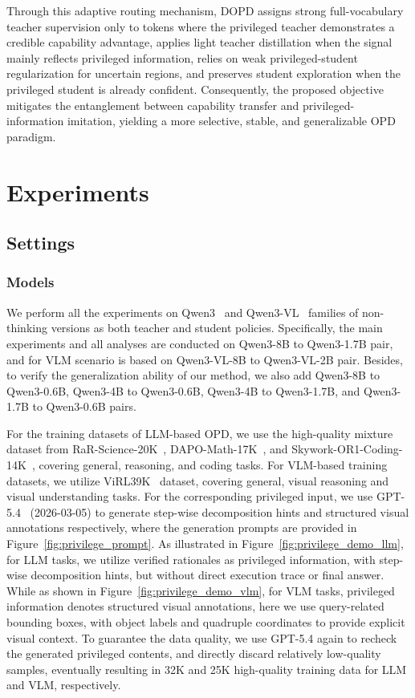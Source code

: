 \documentclass{llmxive}
\begin{document}
Through this adaptive routing mechanism, DOPD assigns strong full-vocabulary teacher supervision only to tokens where the privileged teacher demonstrates a credible capability advantage, applies light teacher distillation when the signal mainly reflects privileged information, relies on weak privileged-student regularization for uncertain regions, and preserves student exploration when the privileged student is already confident. 
Consequently, the proposed objective mitigates the entanglement between capability transfer and privileged-information imitation, yielding a more selective, stable, and generalizable OPD paradigm.




\section{Experiments}
\subsection{Settings}
\subsubsection{Models}
We perform all the experiments on Qwen3~\citep{yang2025qwen3} and Qwen3-VL~\citep{bai2025qwen3} families of non-thinking versions as both teacher and student policies. Specifically, the main experiments and all analyses are conducted on Qwen3-8B to Qwen3-1.7B pair, and for VLM scenario is based on Qwen3-VL-8B to Qwen3-VL-2B pair. Besides, to verify the generalization ability of our method, we also add Qwen3-8B to Qwen3-0.6B, Qwen3-4B to Qwen3-0.6B, Qwen3-4B to Qwen3-1.7B, and Qwen3-1.7B to Qwen3-0.6B pairs. 


For the training datasets of LLM-based OPD, we use the high-quality mixture dataset from RaR-Science-20K~\citep{gunjal2025rubrics}, DAPO-Math-17K~\citep{yu2026dapo}, and Skywork-OR1-Coding-14K~\citep{he2025skywork}, covering general, reasoning, and coding tasks. For VLM-based training datasets, we utilize ViRL39K~\citep{li2026lavida} dataset, covering general, visual reasoning and visual understanding tasks. For the corresponding privileged input, we use GPT-5.4~\citep{gpt54} (2026-03-05) to generate step-wise decomposition hints and structured visual annotations respectively, where the generation prompts are provided in Figure~\ref{fig:privilege_prompt}.
As illustrated in Figure~\ref{fig:privilege_demo_llm}, for LLM tasks, we utilize verified rationales as privileged information, with step-wise decomposition hints, but without direct execution trace or final answer.
While as shown in Figure~\ref{fig:privilege_demo_vlm}, for VLM tasks, privileged information denotes structured visual annotations, here we use query-related bounding boxes, with object labels and quadruple coordinates to provide explicit visual context.
To guarantee the data quality, we use GPT-5.4 again to recheck the generated privileged contents, and directly discard relatively low-quality samples, eventually resulting in 32K and 25K high-quality training data for LLM and VLM, respectively.  
\end{document}
